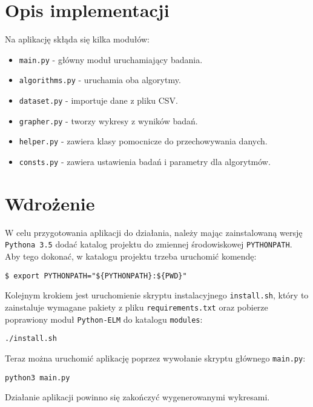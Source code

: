 \newpage

\section{Opis implementacji}

Na aplikację skłąda się kilka modułów:

\begin{itemize}
    \item \texttt{main.py} - główny moduł uruchamiający badania.
    \item \texttt{algorithms.py} - uruchamia oba algorytmy.
    \item \texttt{dataset.py} - importuje dane z pliku CSV.
    \item \texttt{grapher.py} - tworzy wykresy z wyników badań.
    \item \texttt{helper.py} - zawiera klasy pomocnicze do przechowywania danych.
    \item \texttt{consts.py} - zawiera ustawienia badań i parametry dla algorytmów.
\end{itemize}

\section{Wdrożenie}

W celu przygotowania aplikacji do działania, należy mając zainstalowaną wersję \texttt{Pythona 3.5} dodać katalog projektu do zmiennej środowiskowej \texttt{PYTHONPATH}. Aby tego dokonać, w katalogu projektu trzeba uruchomić komendę:

\begin{verbatim}
$ export PYTHONPATH="${PYTHONPATH}:${PWD}"
\end{verbatim}

Kolejnym krokiem jest uruchomienie skryptu instalacyjnego \texttt{install.sh}, który to zainstaluje wymagane pakiety z pliku \texttt{requirements.txt} oraz pobierze poprawiony moduł \texttt{Python-ELM} do katalogu \texttt{modules}:

\begin{verbatim}
./install.sh
\end{verbatim}

Teraz można uruchomić aplikację poprzez wywołanie skryptu głównego \texttt{main.py}:

\begin{verbatim}
python3 main.py
\end{verbatim}

Działanie aplikacji powinno się zakończyć wygenerowanymi wykresami.